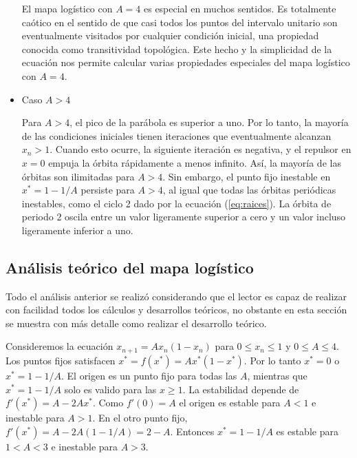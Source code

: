 \begin{itemize}
                    El mapa logístico con $ A = 4 $ es especial en muchos sentidos. Es totalmente caótico en el sentido de que casi todos los puntos del intervalo unitario son eventualmente visitados por cualquier condición inicial, una propiedad conocida como transitividad topológica. Este hecho y la simplicidad de la ecuación nos permite calcular varias propiedades especiales del mapa logístico con $ A = 4 $.

                \item Caso $A > 4$

                    Para $A > 4$, el pico de la parábola es superior a uno. Por lo tanto, la mayoría de las condiciones iniciales tienen iteraciones que eventualmente alcanzan $x_{n} > 1$. Cuando esto ocurre, la siguiente iteración es negativa, y el repulsor en $x = 0$ empuja la órbita rápidamente a menos infinito. Así, la mayoría de las órbitas son ilimitadas para $A > 4$. Sin embargo, el punto fijo inestable en $x^{*} = 1 - 1/A$ persiste para $A > 4$, al igual que todas las órbitas periódicas inestables, como el ciclo 2 dado por la ecuación (\ref{eq:raices}). La órbita de periodo 2 oscila entre un valor ligeramente superior a cero y un valor incluso ligeramente inferior a uno. 

        \end{itemize}

        \subsection{Análisis teórico del mapa logístico}

            Todo el análisis anterior se realizó considerando que el lector es capaz de realizar con facilidad todos los cálculos y desarrollos teóricos, no obstante en esta sección se muestra con más detalle como realizar el desarrollo teórico.

            Consideremos la ecuación $x_{n+1} = A x_{n} (1 - x_{n})$ para $0 \leq x_{n} \leq 1$ y $0 \leq A \leq 4$. Los puntos fijos satisfacen $x^{*} = f(x^{*}) = A x^{*}(1 - x^{*})$. Por lo tanto $x^{*} = 0$  o $x^{*} = 1 - 1/A$. El origen es un punto fijo para todas las $A$, mientras que $x^{*} = 1 - 1/A$ solo es valido para las $x \geq 1$. La estabilidad depende de $f'(x^{*}) = A - 2Ax^{*}$. Como $f'(0) = A $ el origen es estable para $A < 1$ e inestable para $A > 1$. En el otro punto fijo, $f'(x^{*}) = A - 2 A \left( 1 - 1/A \right) = 2 - A$. Entonces $x^{*} = 1 - 1/A$ es estable para $1 < A < 3$ e inestable para $A > 3$.


